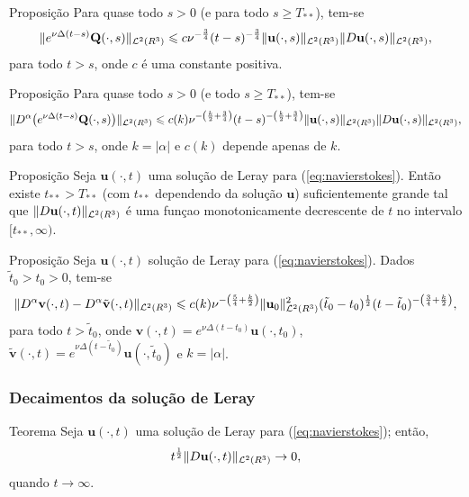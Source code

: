 \documentclass[xcolor=dvipsnames, aspectratio=169, 10pt]{beamer}
\let\mathbb\relax
\newcommand{\bR}{\mathbb{R}}
\newcommand{\bu}{\mathbf{u}}
\newcommand{\bv}{\mathbf{v}}
\newcommand{\BQ}{\mathbf{Q}}
\newcommand{\cL}{\mathcal{L}}
\begin{document}
\begin{frame}
    \begin{block}{Proposição}
        Para quase todo $s > 0$ (e para todo $s \geqslant T_{**}$), tem-se
        \[
            \Vert e^{\nu\Delta(t-s)}\BQ(\cdot,s) \Vert_{\cL^2(\bR^3)} \leqslant c \nu^{-\frac{3}{4}} (t-s)^{-\frac{3}{4}} \Vert \bu(\cdot,s) \Vert_{\cL^2(\bR^3)} \Vert D\bu(\cdot,s) \Vert_{\cL^2(\bR^3)},
        \]
        para todo $t > s$, onde $c$ é uma constante positiva.
    \end{block}

    \begin{block}{Proposição}
        Para quase todo $s > 0$ (e todo $s \geqslant T_{**}$), tem-se
        \[
            \Vert D^{\alpha} \big( e^{\nu\Delta(t-s)}\BQ(\cdot,s)\big) \Vert_{\cL^2(\bR^3)} \leqslant c(k) \nu^{-\left( \frac{k}{2} + \frac{3}{4} \right)} (t - s)^{-\left( \frac{k}{2} + \frac{3}{4}\right)} \Vert \bu(\cdot,s) \Vert_{\cL^2(\bR^3)} \Vert D\bu(\cdot,s) \Vert_{\cL^2(\bR^3)},
        \]
        para todo $t > s$, onde $k = |\alpha|$ e $c(k)$ depende apenas de $k$.
    \end{block}
\end{frame}
\begin{frame}
    \begin{block}{Proposição}
        Seja $\bu(\cdot,t)$ uma solução de Leray para (\ref{eq:navierstokes}). Então existe $t_{**} > T_{**}$ (com $t_{**}$ dependendo da solução $\bu$) suficientemente grande tal que $\Vert D\bu(\cdot,t) \Vert_{\cL^2(\bR^3)}$ é uma funçao monotonicamente decrescente de $t$ no intervalo $[t_{**}, \infty)$.
    \end{block}

    \begin{block}{Proposição}
        Seja $\bu(\cdot,t)$ solução de Leray para (\ref{eq:navierstokes}).
        Dados $\tilde t_0 > t_0 > 0$, tem-se
        \[
            \Vert D^\alpha \bv(\cdot,t) - D^\alpha \tilde{\bv}(\cdot,t)\Vert_{\cL^2(\bR^3)} \leqslant c(k) \nu^{-\left( \frac{5}{4} + \frac{k}{2} \right)} \Vert \bu_0 \Vert_{\cL^2(\bR^3)}^2 (\tilde t_0 - t_0)^{\frac{1}{2}} (t - \tilde t_0)^{-\left( \frac{3}{4} + \frac{k}{2} \right)},
        \]
        para todo $t > \tilde t_0$, onde $\bv(\cdot,t) = e^{\nu\Delta(t-t_0)} \bu(\cdot,t_0)$, $\tilde{\bv}(\cdot,t) = e^{\nu\Delta(t-\tilde t_0)} \bu(\cdot,\tilde t_0)$ e $k = |\alpha|$.
    \end{block}
\end{frame}
\begin{frame}
    \frametitle{Decaimentos da solução de Leray}
    \begin{block}{Teorema}
        Seja $\bu(\cdot,t)$ uma solução de Leray para (\ref{eq:navierstokes}); então,
        \begin{equation} \label{eq:tDuto0}
            t^{\frac{1}{2}} \Vert D\bu(\cdot,t) \Vert_{\cL^2(\bR^3)} \to 0,
        \end{equation}
        quando $t \to \infty$.
    \end{block}
\end{frame}
\end{document}
